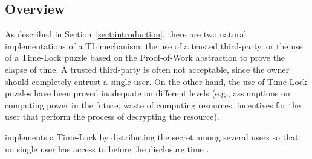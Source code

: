 %
%
%
%

\subsection{Overview}

As described in Section~\ref{sect:introduction}, there are two natural implementations of a TL mechanism: the use of a trusted third-party, or the use of a Time-Lock puzzle based on the Proof-of-Work abstraction to prove the elapse of time.
%
A trusted third-party is often not acceptable, since the owner should completely entrust a single user.
On the other hand, the use of Time-Lock puzzles have been proved inadequate on different levels (e.g., assumptions on computing power in the future, waste of computing resources, incentives for the user that perform the process of decrypting the resource). 

\shortname implements a Time-Lock by distributing the secret \secret among several users so that no single user has access to \secret before the disclosure time \td.

%
%


